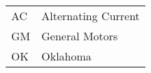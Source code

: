 \begin{longtable}{p{} p{}}
AC & Alternating Current \\
GM & General Motors \\
OK & Oklahoma \\
\end{longtable}
